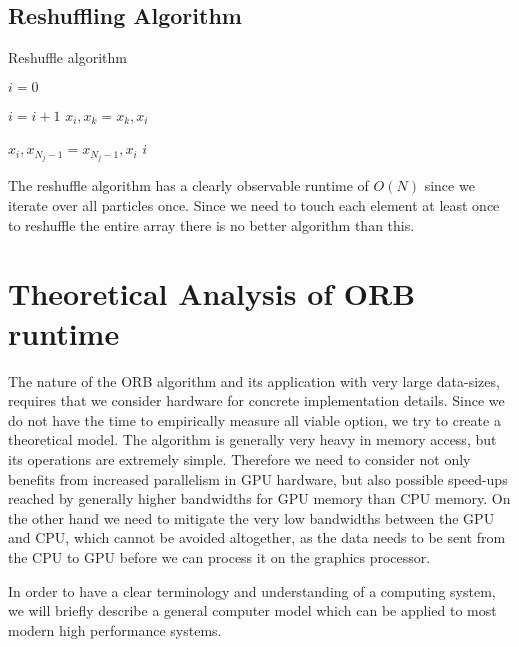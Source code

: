 \documentclass[]{article}
\begin{document}
\subsection{Reshuffling Algorithm}

\begin{algorithm}[H]
	\caption{Reshuffle algorithm}\label{euclid}
	\begin{algorithmic}[1]
		\State $i = 0$
		
		\State $i = i + 1$
		\State $x_{i}, x_{k} = x_{k}, x_{i}$
		\EndIf
		\EndFor
		
		\State $ x_{i}, x_{N_j-1} = x_{N_j-1}, x_{i}$
		\State \Return $i$
		\EndProcedure
	\end{algorithmic}
\end{algorithm}

The reshuffle algorithm has a clearly observable runtime of $O(N)$ since we iterate over all particles once. Since we need to touch each element at least once to reshuffle the entire array there is no better algorithm than this.


\vspace{5mm}

\newpage
\section{Theoretical Analysis of ORB runtime}

The nature of the ORB algorithm and its application with very large data-sizes, requires that we consider hardware for concrete implementation details. Since we do not have the time to empirically measure all viable option, we try to create a theoretical model. The algorithm is generally very heavy in memory access, but its operations are extremely simple. Therefore we need to consider not only benefits from increased parallelism in GPU hardware, but also possible speed-ups reached by generally higher bandwidths for GPU memory than CPU memory. On the other hand we need to mitigate the very low bandwidths between the GPU and CPU, which cannot be avoided altogether, as the data needs to be sent from the CPU to GPU before we can process it on the graphics processor.

In order to have a clear terminology and understanding of a computing system, we will briefly describe a general computer model which can be applied to most modern high performance systems.
\end{document}
